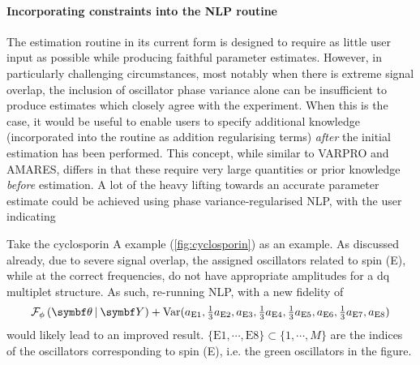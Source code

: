 \paragraph{Incorporating constraints into the \ac{NLP} routine}
The estimation routine in its current form is designed to require as little
user input as possible while producing faithful parameter estimates. However,
in particularly challenging circumstances, most notably when
there is extreme signal overlap, the inclusion of oscillator phase variance
alone can be insufficient to produce estimates which closely agree with the
experiment. When this is the case, it would be useful to enable users to
specify additional knowledge (incorporated into the routine as addition
regularising terms) \emph{after} the initial estimation has been performed.
This concept, while similar to \ac{VARPRO} and \ac{AMARES}, differs in that
these require very large quantities or prior knowledge \emph{before}
estimation. A lot of the heavy lifting towards an accurate parameter estimate could be achieved using phase variance-regularised \ac{NLP}, with the user indicating

Take the cyclosporin A example (\cref{fig:cyclosporin}) as an example. As
discussed already, due to severe signal overlap, the assigned oscillators
related to spin (E), while at the correct frequencies, do not have appropriate
amplitudes for a dq multiplet structure. As such, re-running \ac{NLP}, with a
new fidelity of
\[
    \FphithY + \Var(
        a_{\text{E}1},
        \tfrac{1}{3} a_{\text{E}2},
        a_{\text{E}3},
        \tfrac{1}{3} a_{\text{E}4},
        \tfrac{1}{3} a_{\text{E}5},
        a_{\text{E}6},
        \tfrac{1}{3} a_{\text{E}7},
        a_{\text{E}8}
    )
\]
would likely lead to an improved result.
$\lbrace \text{E}1, \cdots, \text{E}8 \rbrace \subset \lbrace 1, \cdots, M \rbrace$ are the
indices of the oscillators corresponding to spin (E), i.e. the green
oscillators in the figure.
